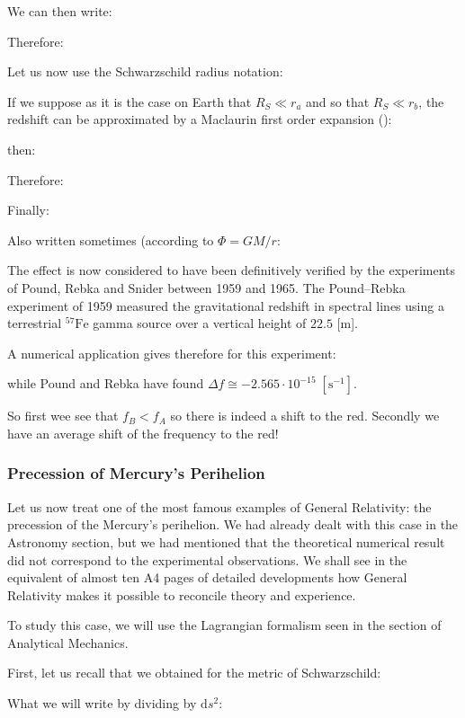 	We can then write:
	
	Therefore:
	
	Let us now use the Schwarzschild radius notation:
	
	If we suppose as it is the case on Earth that $R_S\ll r_a$ and so that $R_S\ll r_b$,  the redshift can be approximated by a Maclaurin first order expansion ():
	
	then:
	
	Therefore:
	
	Finally:
	
	Also written sometimes (according to $\Phi=GM/r$:
	
	The effect is now considered to have been definitively verified by the experiments of Pound, Rebka and Snider between 1959 and 1965. The Pound–Rebka experiment of 1959 measured the gravitational redshift in spectral lines using a terrestrial $^{57}\mathrm{Fe}$ gamma source over a vertical height of $22.5$ [m].
	
	A numerical application gives therefore for this experiment:
	
	while Pound and Rebka have found $\Delta f\cong -2.565\cdot 10^{-15}\;[\text{s}^{-1}]$. 
	
	So first wee see that $f_B<f_A$ so there is indeed a shift to the red. Secondly we have an average shift of the frequency to the red!
	
	\subsubsection{Precession of Mercury's Perihelion}\label{general relativity precession of mercury perihelion}
	Let us now treat one of the most famous examples of General Relativity: the precession of the Mercury's perihelion. We had already dealt with this case in the Astronomy section, but we had mentioned that the theoretical numerical result did not correspond to the experimental observations. We shall see in the equivalent of almost ten A4 pages of detailed developments how General Relativity makes it possible to reconcile theory and experience.

	To study this case, we will use the Lagrangian formalism seen in the section of Analytical Mechanics.

	First, let us recall that we obtained for the metric of Schwarzschild:
	
	What we will write by dividing by $\mathrm{d}s^2$:
	
